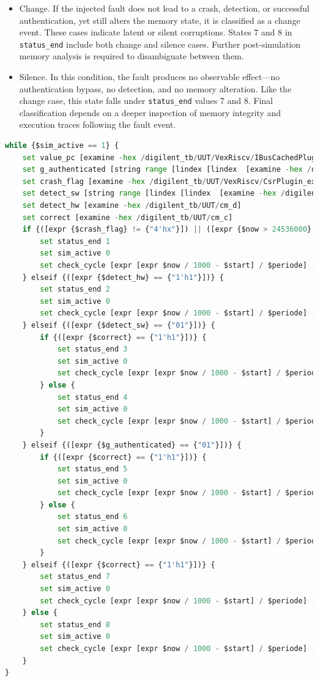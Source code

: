 \begin{itemize}
\item Change. If the injected fault does not lead to a crash, detection, or successful authentication, yet still alters the memory state, it is classified as a change event. These cases indicate latent or silent corruptions. States 7 and 8 in \texttt{status\_end} include both change and silence cases. Further post-simulation memory analysis is required to disambiguate between them.

\item Silence. In this condition, the fault produces no observable effect—no authentication bypass, no detection, and no memory alteration. Like the change case, this state falls under \texttt{status\_end} values 7 and 8. Final classification depends on a deeper inspection of memory integrity and execution traces following the fault event.
\end{itemize}

\begin{lstlisting}[language=python, caption={code\_execution.py}, label={code}]
while {$sim_active == 1} {
    set value_pc [examine -hex /digilent_tb/UUT/VexRiscv/IBusCachedPlugin_fetchPc_pcReg]
    set g_authenticated [string range [lindex [lindex  [examine -hex /digilent_tb/UUT/sram] 0] 4] 10 11]
    set crash_flag [examine -hex /digilent_tb/UUT/VexRiscv/CsrPlugin_exceptionPortCtrl_exceptionContext_code]
    set detect_sw [string range [lindex [lindex  [examine -hex /digilent_tb/UUT/sram] 0] 4] 6 7]
    set detect_hw [examine -hex /digilent_tb/UUT/cm_d]
    set correct [examine -hex /digilent_tb/UUT/cm_c]    
    if {([expr {$crash_flag} != {"4'hx"}]) || ([expr {$now > 24536000} ])} {
        set status_end 1
        set sim_active 0
        set check_cycle [expr [expr $now / 1000 - $start] / $periode] ;
    } elseif {([expr {$detect_hw} == {"1'h1"}])} {
        set status_end 2
        set sim_active 0
        set check_cycle [expr [expr $now / 1000 - $start] / $periode] ;
    } elseif {([expr {$detect_sw} == {"01"}])} {
        if {([expr {$correct} == {"1'h1"}])} {
            set status_end 3
            set sim_active 0
            set check_cycle [expr [expr $now / 1000 - $start] / $periode] ;
        } else {
            set status_end 4
            set sim_active 0
            set check_cycle [expr [expr $now / 1000 - $start] / $periode] ;
        }     
    } elseif {([expr {$g_authenticated} == {"01"}])} {
        if {([expr {$correct} == {"1'h1"}])} {
            set status_end 5
            set sim_active 0
            set check_cycle [expr [expr $now / 1000 - $start] / $periode] ;
        } else {
            set status_end 6
            set sim_active 0
            set check_cycle [expr [expr $now / 1000 - $start] / $periode] ;
        }
    } elseif {([expr {$correct} == {"1'h1"}])} {
        set status_end 7
        set sim_active 0
        set check_cycle [expr [expr $now / 1000 - $start] / $periode] ;
    } else {
        set status_end 8
        set sim_active 0
        set check_cycle [expr [expr $now / 1000 - $start] / $periode] ;
    }
}
\end{lstlisting}

